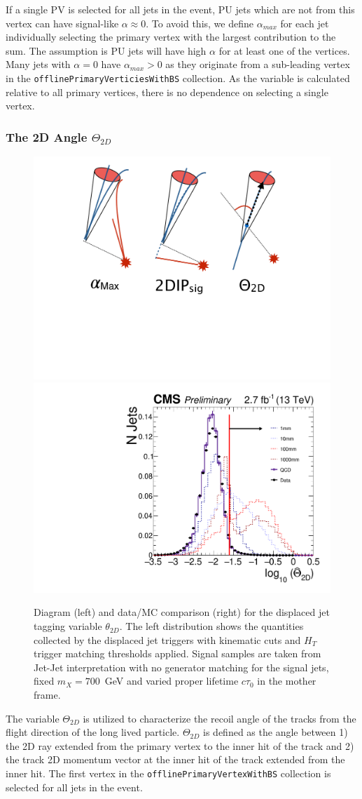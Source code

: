 If a single PV is selected for all jets in the event, PU jets which are not from this vertex can have signal-like $\alpha \approx 0$. 
To avoid this, we define $\alpha_{max}$ for each jet individually selecting the primary vertex with
the largest contribution to the sum. The assumption is PU jets will have high $\alpha$ for at least one 
of the vertices. Many jets with $\alpha = 0$ have $\alpha_{max} > 0$ as they originate
from a sub-leading vertex in the \texttt{offlinePrimaryVerticiesWithBS} collection. As the variable is calculated relative to all primary
vertices, there is no dependence on selecting a single vertex. 

\subsubsection{The 2D Angle $\Theta_{2D}$}

\begin{figure}
\begin{center}
\includegraphics[width=.2\textwidth]{figures/pas/DIAGRAMS/theta_diag.pdf}
\includegraphics[width=.5\textwidth]{figures/pas/SELECTION/76x_pu/DJET_medianCosTheta.pdf}
\caption{Diagram (left) and data/MC comparison (right) for the displaced jet tagging variable $\theta_{2D}$. The left distribution  shows the quantities collected by the displaced jet triggers with kinematic cuts and $H_T$ trigger matching thresholds applied. Signal samples are taken from Jet-Jet interpretation with no generator matching for the signal jets, fixed $m_X=700$~GeV and varied proper lifetime $c\tau_0$ in the mother frame.
 \label{fig:theta}}
\end{center}
\end{figure}

The variable $\Theta_{2D}$ is utilized to characterize the recoil angle
of the tracks from the flight direction of the long lived particle. $\Theta_{2D}$ is defined as the angle between 1) the 2D ray extended from the primary vertex
to the inner hit of the track and 2) the track 2D momentum vector at the inner hit of the track extended from the inner hit. The first vertex in the
\texttt{offlinePrimaryVertexWithBS} collection is selected for all jets in the event.


